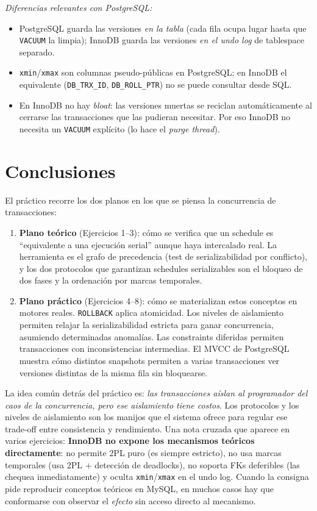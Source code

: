 \documentclass[11pt,a4paper]{article}
\begin{document}
\textit{Diferencias relevantes con PostgreSQL:}

\begin{itemize}
    \item PostgreSQL guarda las versiones \emph{en la tabla} (cada fila ocupa lugar hasta que \texttt{VACUUM} la limpia); InnoDB guarda las versiones \emph{en el undo log} de tablespace separado.
    \item \texttt{xmin}/\texttt{xmax} son columnas pseudo-públicas en PostgreSQL; en InnoDB el equivalente (\texttt{DB\_TRX\_ID}, \texttt{DB\_ROLL\_PTR}) no se puede consultar desde SQL.
    \item En InnoDB no hay \emph{bloat}: las versiones muertas se reciclan automáticamente al cerrarse las transacciones que las pudieran necesitar. Por eso InnoDB no necesita un \texttt{VACUUM} explícito (lo hace el \emph{purge thread}).
\end{itemize}

\section*{Conclusiones}

El práctico recorre los dos planos en los que se piensa la concurrencia de transacciones:

\begin{enumerate}
    \item \textbf{Plano teórico} (Ejercicios 1--3): cómo se verifica que un schedule es ``equivalente a una ejecución serial'' aunque haya intercalado real. La herramienta es el grafo de precedencia (test de serializabilidad por conflicto), y los dos protocolos que garantizan schedules serializables son el bloqueo de dos fases y la ordenación por marcas temporales.
    \item \textbf{Plano práctico} (Ejercicios 4--8): cómo se materializan estos conceptos en motores reales. \texttt{ROLLBACK} aplica atomicidad. Los niveles de aislamiento permiten relajar la serializabilidad estricta para ganar concurrencia, asumiendo determinadas anomalías. Las constraints diferidas permiten transacciones con inconsistencias intermedias. El MVCC de PostgreSQL muestra cómo distintos snapshots permiten a varias transacciones ver versiones distintas de la misma fila sin bloquearse.
\end{enumerate}

La idea común detrás del práctico es: \emph{las transacciones aíslan al programador del caos de la concurrencia, pero ese aislamiento tiene costos}. Los protocolos y los niveles de aislamiento son los manijos que el sistema ofrece para regular ese trade-off entre consistencia y rendimiento. Una nota cruzada que aparece en varios ejercicios: \textbf{InnoDB no expone los mecanismos teóricos directamente}: no permite 2PL puro (es siempre estricto), no usa marcas temporales (usa 2PL + detección de deadlocks), no soporta FKs deferibles (las chequea inmediatamente) y oculta \texttt{xmin}/\texttt{xmax} en el undo log. Cuando la consigna pide reproducir conceptos teóricos en MySQL, en muchos casos hay que conformarse con observar el \emph{efecto} sin acceso directo al mecanismo.
\end{document}
